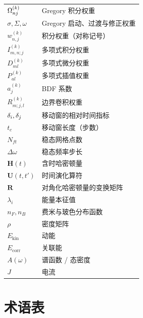 \begin{longtable}{@{}p{}p{}@{}}
    $\Omega^{(k)}_{nj}$ & Gregory 积分权重 \\
    $\sigma,\Sigma,\omega$ & Gregory 启动、过渡与修正权重 \\
    $w^{(k)}_{n,j}$ & 积分权重（对称记号） \\
    $I^{(k)}_{m,n;j}$ & 多项式积分权重 \\
    $D^{(k)}_{ml}$ & 多项式微分权重 \\
    $P^{(k)}_{al}$ & 多项式插值权重 \\
    $a^{(k)}_j$ & BDF 系数 \\
    $R^{(k)}_{m;j,l}$ & 边界卷积权重 \\
    $\delta_i,\delta_j$ & 移动窗的相对时间指标 \\
    $t_c$ & 移动窗长度（步数） \\
    $N_{ft}$ & 稳态网格点数 \\
    $\Delta\omega$ & 稳态频率步长 \\
    $\bm{H}(t)$ & 含时哈密顿量 \\
    $\bm{U}(t,t')$ & 时间演化算符 \\
    $\bm{R}$ & 对角化哈密顿量的变换矩阵 \\
    $\lambda_i$ & 能量本征值 \\
    $n_F,n_B$ & 费米与玻色分布函数 \\
    $\rho$ & 密度矩阵 \\
    $E_{\mathrm{kin}}$ & 动能 \\
    $E_{\mathrm{corr}}$ & 关联能 \\
    $A(\omega)$ & 谱函数 / 态密度 \\
    $J$ & 电流 \\
\end{longtable}

\section{术语表}
\label{sec:glossary}

